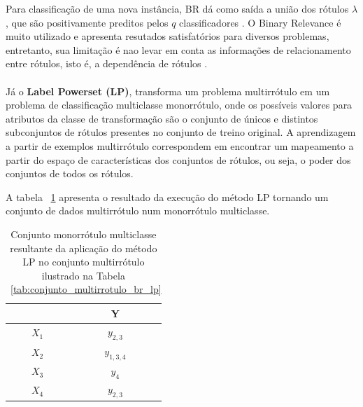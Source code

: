 Para classificação de uma nova instância, BR dá como saída a união dos rótulos $\lambda$, que são positivamente preditos pelos $q$ classificadores \cite{tsoumakas2011random}.
O Binary Relevance é muito utilizado e apresenta resutados satisfatórios para diversos problemas, entretanto, sua limitação é nao levar em conta as informações de relacionamento entre rótulos, isto é, a dependência de rótulos \cite{chermanaprendizado}. 

\paragraph{}
Já o \textbf{Label Powerset (LP)}, transforma um problema multirrótulo em um problema de classificação multiclasse monorrótulo, onde os possíveis valores para atributos da classe de transformação são o conjunto de únicos e distintos subconjuntos de rótulos
presentes no conjunto de treino original. A aprendizagem a partir de exemplos multirrótulo correspondem em encontrar um mapeamento a partir do espaço de características dos conjuntos de rótulos, ou seja, o poder dos conjuntos de todos os rótulos.

A tabela ~\ref{tab:conjunto_monorrotulo_multiclasse_lp} apresenta o resultado da execução do método LP tornando um conjunto de dados multirrótulo num monorrótulo multiclasse.

  
\begin{table}[h]
\label{tab:conjunto_monorrotulo_multiclasse_lp}
\centering
    \begin{scriptsize}
       \begin{tabular}{c|c}

\hline
  	    &       Y	    			\\	\hline\hline
$X_1$	&	$y_{2,3}$	\\	\hline
$X_2$	&	$y_{1,3,4}$		\\	\hline
$X_3$	&	$y_4$		\\	\hline
$X_4$	&	$y_{2,3}$		\\	\hline

\end{tabular}
   \end{scriptsize}
\caption{Conjunto monorrótulo multiclasse resultante da aplicação do método LP no conjunto multirrótulo ilustrado na Tabela ~\ref{tab:conjunto_multirrotulo_br_lp}}
\end{table}

